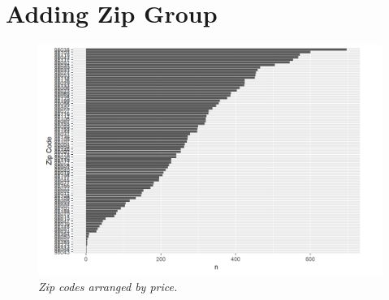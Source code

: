\documentclass[12pt,letterpaper]{article}
\begin{document}
\section{Adding Zip Group}
\begin{figure}[!h]
	\includegraphics[width= 150mm]{image}
	\caption{\small \sl Zip codes arranged by price.\label{fig:Stupendous}} 
\end{figure}
\end{document}

